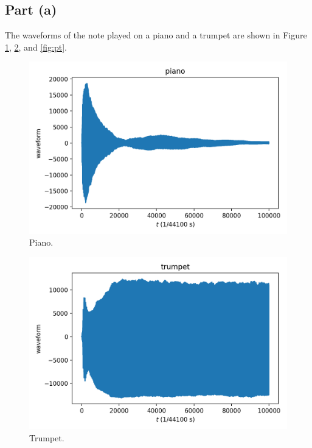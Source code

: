 \documentclass[11pt]{article}
\begin{document}
\subsection{Part (a)}
The waveforms of the note played on a piano and a trumpet are shown in Figure \ref{fig:piano}, \ref{fig:trumpet}, and \ref{fig:pt}.
\begin{figure}[H]
    \centering
    \includegraphics[scale = 0.6]{images/ps-8-2p.png}
    \caption{Piano.}
    \label{fig:piano}
\end{figure}
\begin{figure}[H]
    \centering
    \includegraphics[scale = 0.6]{images/ps-8-2t.png}
    \caption{Trumpet.}
    \label{fig:trumpet}
\end{figure}
\end{document}
